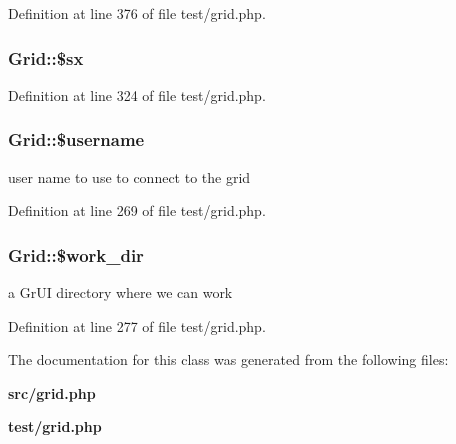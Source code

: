 Definition at line 376 of file test/grid.php.
\subsubsection{\setlength{\rightskip}{0pt plus 5cm}Grid::\$sx}\label{classGrid_o13}




Definition at line 324 of file test/grid.php.
\subsubsection{\setlength{\rightskip}{0pt plus 5cm}Grid::\$username}\label{classGrid_o1}


user name to use to connect to the grid 



Definition at line 269 of file test/grid.php.
\subsubsection{\setlength{\rightskip}{0pt plus 5cm}Grid::\$work\_\-dir}\label{classGrid_o5}


a Gr\-UI directory where we can work 



Definition at line 277 of file test/grid.php.

The documentation for this class was generated from the following files:\begin{CompactItemize}
\item 
{\bf src/grid.php}\item 
{\bf test/grid.php}\end{CompactItemize}
